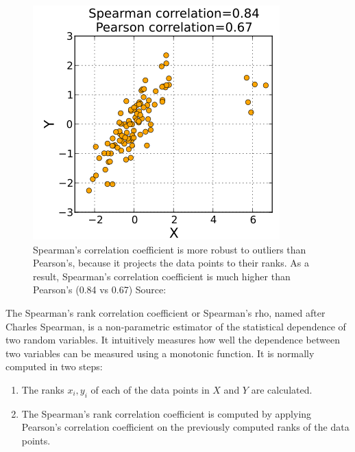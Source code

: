 \begin{figure}[h]
  \centering
\includegraphics[scale=0.6]{images/spearman3.png}
\caption{Spearman's correlation coefficient is
more robust to outliers than Pearson's, because
it projects the data points to their ranks. As a result, Spearman's correlation
coefficient is much higher than Pearson's (0.84 vs 0.67)
Source:\cite{spearman2009Wiki}}
\label{fig:spearman3}
\end{figure}

The Spearman's rank correlation coefficient or Spearman's rho, named after
Charles Spearman, is a non-parametric estimator of the statistical dependence of
two random variables\cite{lehman2005jmp}. It intuitively measures how well
the dependence between two variables can be measured using a monotonic function.
It is normally computed in two steps:
\begin{enumerate}
 \item The ranks $ x_i, y_i $ of each of the data points in $X$ and $Y$ are
calculated.  
 \item The Spearman's rank correlation coefficient is computed by applying
Pearson's correlation coefficient on the previously computed ranks of the data
points\cite{myers2010research}.
\end{enumerate}


